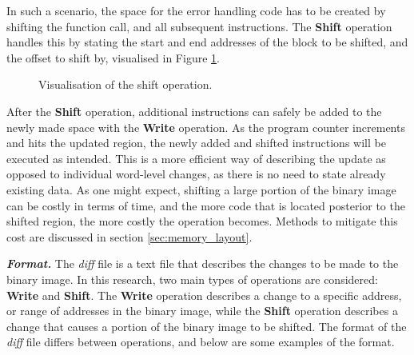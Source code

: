 In such a scenario, the space for the error handling code has to be created by shifting the function call, and all subsequent instructions. The \textbf{Shift} operation handles this by stating the start and end addresses of the block to be shifted, and the offset to shift by, visualised in Figure \ref{fig:shift_example}. 
\begin{figure}[!ht]
    \begin{shaded}
        \centering
        {
            \setlength{\fboxsep}{0pt}%
            \setlength{\fboxrule}{0.5pt}%
        }
        \caption{Visualisation of the shift operation.}
        \label{fig:shift_example}
    \end{shaded}
\end{figure}
After the \textbf{Shift} operation, additional instructions can safely be added to the newly made space with the \textbf{Write} operation. As the program counter increments and hits the updated region, the newly added and shifted instructions will be executed as intended. This is a more efficient way of describing the update as opposed to individual word-level changes, as there is no need to state already existing data. As one might expect, shifting a large portion of the binary image can be costly in terms of time, and the more code that is located posterior to the shifted region, the more costly the operation becomes. Methods to mitigate this cost are discussed in section \ref{sec:memory_layout}.

\textbf{\textit{Format.}} 
The \textit{diff} file is a text file that describes the changes to be made to the binary image. In this research, two main types of operations are considered: \textbf{Write} and \textbf{Shift}. The \textbf{Write} operation describes a change to a specific address, or range of addresses in the binary image, while the \textbf{Shift} operation describes a change that causes a portion of the binary image to be shifted. The format of the \textit{diff} file differs between operations, and below are some examples of the format.

